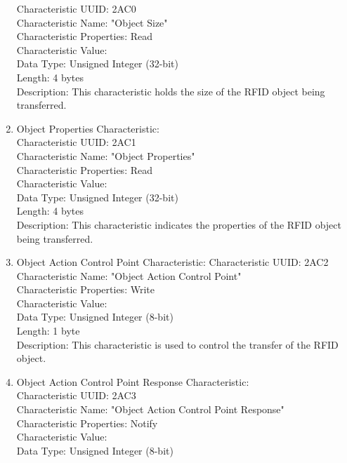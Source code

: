 \documentclass[a4paper,11pt]{article}%
\begin{document}
\begin{enumerate}
          Characteristic UUID: 2AC0\\
          Characteristic Name: "Object Size"\\
          Characteristic Properties: Read\\
          Characteristic Value:\\
          Data Type: Unsigned Integer (32-bit)\\
          Length: 4 bytes\\
          Description: This characteristic holds the size of the RFID object being transferred.\\
    \item Object Properties Characteristic:\\
          Characteristic UUID: 2AC1\\
          Characteristic Name: "Object Properties"\\
          Characteristic Properties: Read\\
          Characteristic Value:\\
          Data Type: Unsigned Integer (32-bit)\\
          Length: 4 bytes\\
          Description: This characteristic indicates the properties of the RFID object being transferred.
    \item Object Action Control Point Characteristic:
          Characteristic UUID: 2AC2\\
          Characteristic Name: "Object Action Control Point"\\
          Characteristic Properties: Write\\
          Characteristic Value:\\
          Data Type: Unsigned Integer (8-bit)\\
          Length: 1 byte\\
          Description: This characteristic is used to control the transfer of the RFID object.
    \item Object Action Control Point Response Characteristic:\\
          Characteristic UUID: 2AC3\\
          Characteristic Name: "Object Action Control Point Response"\\
          Characteristic Properties: Notify\\
          Characteristic Value:\\
          Data Type: Unsigned Integer (8-bit)\\

\end{enumerate}
\end{document}
